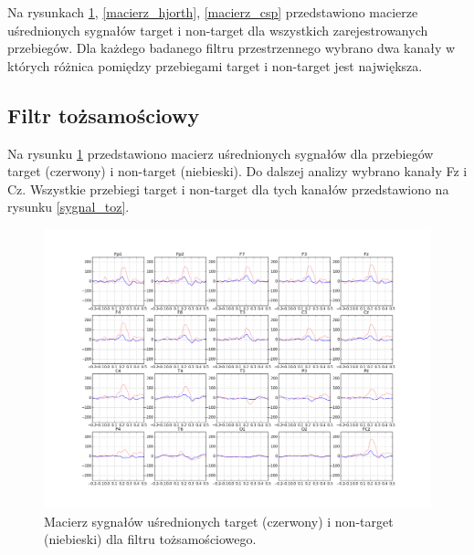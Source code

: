 \documentclass[licencjacka,openright]{pracamgr}
\begin{document}
Na rysunkach \ref{macierz_toz}, \ref{macierz_hjorth}, \ref{macierz_csp} przedstawiono macierze uśrednionych sygnałów target i non-target dla wszystkich zarejestrowanych przebiegów. Dla każdego badanego filtru przestrzennego wybrano dwa kanały w których różnica pomiędzy przebiegami target i non-target jest największa.

\subsection{Filtr tożsamościowy}

Na rysunku \ref{macierz_toz} przedstawiono macierz uśrednionych sygnałów dla przebiegów target (czerwony) i non-target (niebieski). Do dalszej analizy wybrano kanały Fz i Cz. Wszystkie przebiegi target i non-target dla tych kanałów przedstawiono na rysunku \ref{sygnal_toz}.

\begin{figure}
\centering
\includegraphics[scale=0.35, trim=10mm 25mm 10mm 25mm, clip=True]{pics/macierz_toz.png}
\caption{Macierz sygnałów uśrednionych target (czerwony) i non-target (niebieski) dla filtru tożsamościowego.}
\label{macierz_toz}
\end{figure}
\end{document}
